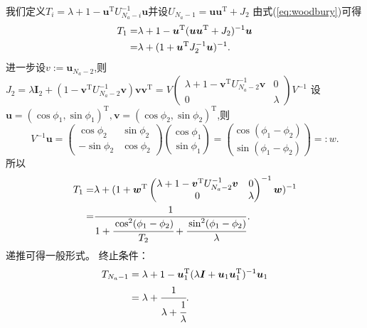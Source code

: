 我们定义$T_i=\lambda+1-\bm{u}^{\textrm{T}} U_{N_a-i}^{-1}\bm{u}$并设$U_{N_a-1}=\bm{u}\bm{u}^{\textrm{T}}+J_2$
由式(\ref{eq:woodbury})可得
\begin{align}\notag
T_1=&\lambda+1-\bm{u}^{\textrm{T}} (\bm{u}\bm{u}^{\textrm{T}}+J_2)^{-1}\bm{u}\\
=&\lambda+(1+\bm{u}^{\textrm{T}} J_2^{-1}\bm{u})^{-1}.
\end{align}
进一步设$v:=\bm{u}_{N_a-2}$,则$J_2=\lambda \bm{I}_2+(1-\bm{v}^{\textrm{T}} U_{N_a-2}^{-1}\bm{v})\bm{v}\bm{v}^{\textrm{T}}=V\begin{pmatrix}
                     \lambda+1-\bm{v}^{\textrm{T}} U_{N_a-2}^{-1}\bm{v} & 0 \\
                     0 & \lambda
                   \end{pmatrix}V^{-1}$
设$\bm{u}=(\cos\phi_1,\sin\phi_1)^{\textrm{T}},\bm{v}=(\cos\phi_2,\sin\phi_2)^{\textrm{T}}$,则
\begin{equation}
V^{-1}\bm{u}=\begin{pmatrix}
                     \cos\phi_2 & \sin\phi_2 \\
                     -\sin\phi_2 & \cos\phi_2
                   \end{pmatrix}\binom{\cos\phi_1}{\sin\phi_1}=\binom{\cos(\phi_1-\phi_2)}{\sin(\phi_1-\phi_2)}=:w.
\end{equation}
所以
\begin{align*}
T_1=&\lambda+(1+\bm{w}^{\textrm{T}} \begin{pmatrix}
                     \lambda+1-\bm{v}^{\textrm{T}} U_{N_a-2}^{-1}\bm{v} & 0 \\
                     0 & \lambda
                   \end{pmatrix}^{-1}\bm{w})^{-1}\\
                   =&\frac{1}{1+\cfrac{\cos^2(\phi_1-\phi_2)}{T_2}+\cfrac{\sin^2(\phi_1-\phi_2)}{\lambda}}.
\end{align*}
递推可得一般形式。
终止条件：
\begin{align*}
T_{N_a-1}&=\lambda+1-\bm{u}_1^{\textrm{T}}(\lambda\bm{I}+\bm{u}_1\bm{u}_1^{\textrm{T}})^{-1}\bm{u}_1\\
&=\lambda+\cfrac{1}{\lambda+\cfrac{1}{\lambda}}.
\end{align*}
